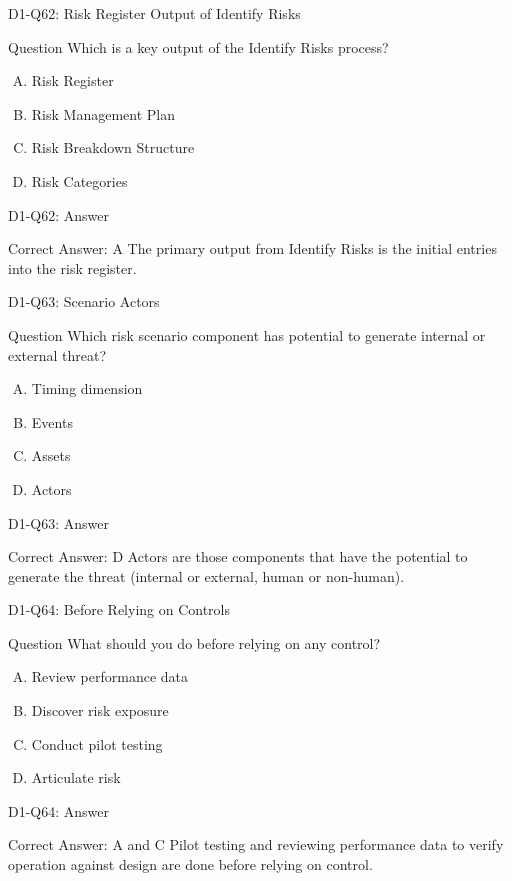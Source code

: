 \documentclass{beamer}
\begin{document}
	\begin{frame}{D1-Q62: Risk Register Output of Identify Risks}
		\begin{block}{Question}
			Which is a key output of the Identify Risks process?
		\end{block}
		\begin{enumerate}[(A)]
			\item Risk Register
			\item Risk Management Plan
			\item Risk Breakdown Structure
			\item Risk Categories
		\end{enumerate}
	\end{frame}
	\begin{frame}{D1-Q62: Answer}
		\begin{block}{Correct Answer: A}
			The primary output from Identify Risks is the initial entries into the risk register.
		\end{block}
	\end{frame}
	
	\begin{frame}{D1-Q63: Scenario Actors}
		\begin{block}{Question}
			Which risk scenario component has potential to generate internal or external threat?
		\end{block}
		\begin{enumerate}[(A)]
			\item Timing dimension
			\item Events
			\item Assets
			\item Actors
		\end{enumerate}
	\end{frame}
	\begin{frame}{D1-Q63: Answer}
		\begin{block}{Correct Answer: D}
			Actors are those components that have the potential to generate the threat (internal or external, human or non-human).
		\end{block}
	\end{frame}
	
	\begin{frame}{D1-Q64: Before Relying on Controls}
		\begin{block}{Question}
			What should you do before relying on any control?
		\end{block}
		\begin{enumerate}[(A)]
			\item Review performance data
			\item Discover risk exposure
			\item Conduct pilot testing
			\item Articulate risk
		\end{enumerate}
	\end{frame}
	\begin{frame}{D1-Q64: Answer}
		\begin{block}{Correct Answer: A and C}
			Pilot testing and reviewing performance data to verify operation against design are done before relying on control.
		\end{block}
	\end{frame}
	
\end{document}
